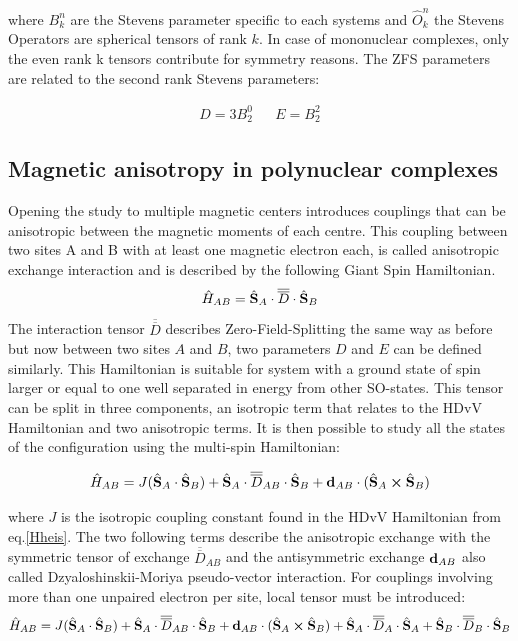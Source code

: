 \documentclass[12pt]{report}
\numberwithin{equation}{section}
\begin{document}
where $B_k^n$ are the Stevens parameter specific to each systems and $\hat{O}_k^n$ the Stevens Operators are spherical tensors of rank $k$.
In case of mononuclear complexes, only the even rank k tensors contribute for symmetry reasons. 
The ZFS parameters are related to the second rank Stevens parameters:

\begin{align}
    D=3B_2^0 && E=B_2^2
\end{align}


\subsection{Magnetic anisotropy in polynuclear complexes}
Opening the study to multiple magnetic centers introduces couplings that can be anisotropic between the magnetic moments of each centre. 
This coupling between two sites A and B with at least one magnetic electron each, is called anisotropic exchange interaction and is described by the following Giant Spin Hamiltonian\cite{maurice_zero-field_2011}.
\begin{equation}
    \hat{H}_{AB}=\hat{\vb S}_A\cdot \overline{\overline{D}} \cdot \hat{\vb S}_B
\end{equation}
The interaction tensor $\overline{\overline{D}}$ describes Zero-Field-Splitting the same way as before but now between two sites $A$ and $B$, two parameters $D$ and $E$ can be defined similarly. 
This Hamiltonian is suitable for system with a ground state of spin larger or equal to one well separated in energy from other SO-states.
This tensor can be split in three components, an isotropic term that relates to the HDvV Hamiltonian and two anisotropic terms.
It is then possible to study all the states of the configuration using the multi-spin Hamiltonian\cite{noauthor_r_nodate}:

\begin{equation}
    \hat{H}_{AB}=J(\hat{\vb S}_A \cdot \hat{\vb S}_B) + \hat{\vb S}_A \cdot\overline{\overline{D}}_{AB} \cdot \hat{\vb S}_B + \vb{d}_{AB} \cdot (\hat{\vb S}_A \cross \hat{\vb S}_B)
\end{equation}

\noindent where $J$ is the isotropic coupling constant found in the HDvV Hamiltonian from eq.\ref{Hheis}.
The two following terms describe the anisotropic exchange with the symmetric tensor of exchange $\overline{\overline{D}}_{AB}$ and the antisymmetric exchange $\vb{d}_{AB}$ also called Dzyaloshinskii-Moriya pseudo-vector interaction.
For couplings involving more than one unpaired electron per site, local tensor must be introduced:
\begin{equation}\label{HMS}
    \hat{H}_{AB}=J(\hat{\vb S}_A \cdot \hat{\vb S}_B) + \hat{\vb S}_A \cdot\overline{\overline{D}}_{AB} \cdot \hat{\vb S}_B + \vb{d}_{AB} \cdot (\hat{\vb S}_A \cross \hat{\vb S}_B) +\hat{\vb S}_A \cdot\overline{\overline{D}}_{A} \cdot \hat{\vb S}_A +\hat{\vb S}_B \cdot\overline{\overline{D}}_{B} \cdot \hat{\vb S}_B
\end{equation}
\end{document}
